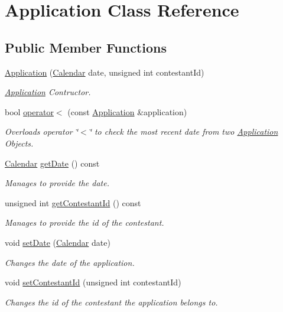 \hypertarget{class_application}{}\section{Application Class Reference}
\label{class_application}
\subsection*{Public Member Functions}
\begin{DoxyCompactItemize}
\item 
\hyperlink{class_application_a562a062d2e3b12ce07550aa54c6cc4f2}{Application} (\hyperlink{class_calendar}{Calendar} date, unsigned int contestant\+Id)
\begin{DoxyCompactList}\small\item\em \hyperlink{class_application}{Application} Contructor. \end{DoxyCompactList}\item 
bool \hyperlink{class_application_a9ac9bea7fda70aa30204d1b4f7deb4ea}{operator$<$} (const \hyperlink{class_application}{Application} \&application)
\begin{DoxyCompactList}\small\item\em Overloads operator \char`\"{}$<$\char`\"{} to check the most recent date from two \hyperlink{class_application}{Application} Objects. \end{DoxyCompactList}\item 
\hyperlink{class_calendar}{Calendar} \hyperlink{class_application_a2f6abd976e5ab287a89601ec7698e3a3}{get\+Date} () const
\begin{DoxyCompactList}\small\item\em Manages to provide the date. \end{DoxyCompactList}\item 
unsigned int \hyperlink{class_application_adeaebb7eed5b43dbb628eba135096ba8}{get\+Contestant\+Id} () const
\begin{DoxyCompactList}\small\item\em Manages to provide the id of the contestant. \end{DoxyCompactList}\item 
void \hyperlink{class_application_acc2019632c740b9384cf66e653c9b1de}{set\+Date} (\hyperlink{class_calendar}{Calendar} date)
\begin{DoxyCompactList}\small\item\em Changes the date of the application. \end{DoxyCompactList}\item 
void \hyperlink{class_application_ae3c4870f283dff867d10581cbbb3de5d}{set\+Contestant\+Id} (unsigned int contestant\+Id)
\begin{DoxyCompactList}\small\item\em Changes the id of the contestant the application belongs to. \end{DoxyCompactList}\end{DoxyCompactItemize}



